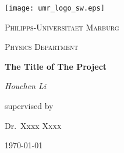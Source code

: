 \begin{titlepage}
	\centering
	\texttt{[image: umr\_logo\_sw.eps]}\par\vspace{1cm}
	{\scshape\LARGE Philipps-Universitaet Marburg\par}
	\vspace{1cm}
	{\scshape\Large Physics Department\par}
	\vspace{1.5cm}
	{\huge\bfseries The Title of The Project\par}
	\vspace{2cm}
	{\Large\itshape Houchen Li\par}
	\vfill
	supervised by\par
	Dr.~Xxxx \textsc{Xxxx}
		
	\vfill

	{\large \today\par}


\end{titlepage}
